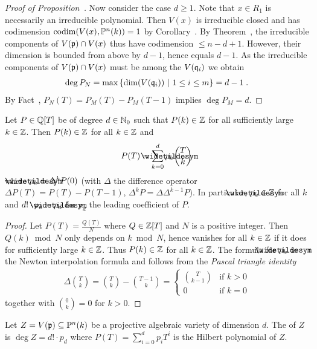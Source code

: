 \documentclass[a4paper,parskip=half,numbers=enddot, DIV=12, headheight=30pt]{scrreprt}
\begin{document}
\begin{proof}[Proof of Proposition~]
    Now consider the case $d\geq 1$. Note that $x\in R_1$ is necessarily an irreducible polynomial. Then $V(x)$ is irreducible closed and has codimension $\operatorname{codim} (V(x),\mathbb{P}^n(k))=1$ by Corollary~. By Theorem~, the irreducible components of $V(\mathfrak{p})\cap V(x)$ thus have codimension $\leq n-d+1$. However, their dimension is bounded from above by $d-1$, hence equals $d-1$. As the irreducible components of $V(\mathfrak{p})\cap V(x)$ must be among the $V(\mathfrak{q}_i)$ we obtain 
    \begin{align*}
    	\deg P_N=\max\left\{\dim(V(\mathfrak{q}_i))\ \middle|\  1\leq i\leq m\right\} = d-1\;.
    \end{align*}
    By Fact~, $P_N(T) = P_M(T) - P_M(T-1)$ implies $\deg P_M =d$.
\end{proof}
\begin{lem}[a.k.a. Lemma~1] 
    Let $P\in \mathbb{Q}[T]$ be of degree $d\in\mathbb{N}_0$ such that $P(k)\in \mathbb{Z}$ for all sufficiently large $k\in\mathbb{Z}$. Then $P(k) \in \mathbb{Z}$ for all $k\in \mathbb{Z}$ and 
    \begin{align*}
        P(T) = \sum_{k=0}^d \snake p_k \binom Tk
    \end{align*}
    where $\snake p_k = \Delta^kP(0)$ (with $\Delta$ the difference operator $\Delta P(T) = P(T)-P(T-1)$, $\Delta^k P = \Delta \Delta^{k-1} P$). In particular, $\snake p_k\in\IZ$ for all $k$ and $d!\cdot p_d = \snake p_d$ for $p_d$ the leading coefficient of $P$.
\end{lem}
\begin{proof}
    Let $P(T) = \frac{Q(T)}{N}$ where $Q\in \mathbb{Z}[T]$ and $N$ is a positive integer. Then $Q(k)\bmod N$ only depends on $k\bmod N$, hence vanishes for all $k\in \mathbb{Z}$ if it does for sufficiently large $k\in \mathbb{Z}$. Thus $P(k)\in \mathbb{Z}$ for all $k\in \mathbb{Z}$. The formula for $\snake p_k$ is the Newton interpolation formula and follows from the \emph{Pascal triangle identity}
    \begin{align*}
        \Delta \binom Tk= \binom{T}{k}-\binom{T-1}{k}= \begin{cases} \binom T{k-1} & \text{if }k>0\\ 0 &\text{if }k=0 \end{cases}
    \end{align*}
    together with $\binom 0k = 0$ for $k>0$.
\end{proof}
\begin{defi}
    Let $Z= V(\mathfrak{p}) \subseteq \mathbb{P}^n(k)$ be a projective algebraic variety of dimension $d$. The  of $Z$ is $\deg Z=d!\cdot p_d$ where $P(T) = \sum_{i=0}^d p_i T^i$ is the Hilbert polynomial of $Z$.
\end{defi}
\end{document}
